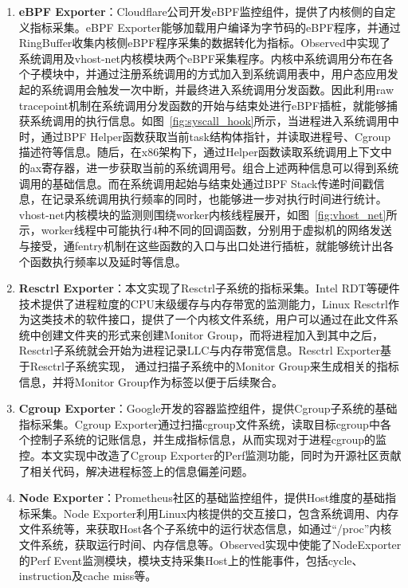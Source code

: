 \begin{enumerate}
    \item \textbf{eBPF Exporter}：Cloudflare公司开发eBPF监控组件，提供了内核侧的自定义指标采集。eBPF Exporter能够加载用户编译为字节码的eBPF程序，并通过RingBuffer收集内核侧eBPF程序采集的数据转化为指标。Observed中实现了系统调用及vhost-net内核模块两个eBPF采集程序。内核中系统调用分布在各个子模块中，并通过注册系统调用的方式加入到系统调用表中，用户态应用发起的系统调用会触发一次中断，并最终进入系统调用分发函数。因此利用raw tracepoint机制在系统调用分发函数的开始与结束处进行eBPF插桩，就能够捕获系统调用的执行信息。如图~\ref{fig:syscall_hook}所示，当进程进入系统调用中时，通过BPF Helper函数获取当前task结构体指针，并读取进程号、Cgroup描述符等信息。随后，在x86架构下，通过Helper函数读取系统调用上下文中的ax寄存器，进一步获取当前的系统调用号。组合上述两种信息可以得到系统调用的基础信息。而在系统调用起始与结束处通过BPF Stack传递时间戳信息，在记录系统调用执行频率的同时，也能够进一步对执行时间进行统计。vhost-net内核模块的监测则围绕worker内核线程展开，如图~\ref{fig:vhost_net}所示，worker线程中可能执行4种不同的回调函数，分别用于虚拟机的网络发送与接受，通fentry机制在这些函数的入口与出口处进行插桩，就能够统计出各个函数执行频率以及延时等信息。

    \item \textbf{Resctrl Exporter}：本文实现了Resctrl子系统的指标采集。Intel RDT等硬件技术提供了进程粒度的CPU末级缓存与内存带宽的监测能力，Linux Resctrl作为这类技术的软件接口，提供了一个内核文件系统，用户可以通过在此文件系统中创建文件夹的形式来创建Monitor Group，而将进程加入到其中之后，Resctrl子系统就会开始为进程记录LLC与内存带宽信息。Resctrl Exporter基于Resctrl子系统实现， 通过扫描子系统中的Monitor Group来生成相关的指标信息，并将Monitor Group作为标签以便于后续聚合。
    
    \item \textbf{Cgroup Exporter}：Google开发的容器监控组件，提供Cgroup子系统的基础指标采集。Cgroup Exporter通过扫描cgroup文件系统，读取目标cgroup中各个控制子系统的记账信息，并生成指标信息，从而实现对于进程cgroup的监控。本文实现中改造了Cgroup Exporter的Perf监测功能，同时为开源社区贡献了相关代码，解决进程标签上的信息偏差问题。
    
    \item \textbf{Node Exporter}：Prometheus社区的基础监控组件，提供Host维度的基础指标采集。Node Exporter利用Linux内核提供的交互接口，包含系统调用、内存文件系统等，来获取Host各个子系统中的运行状态信息，如通过“/proc”内核文件系统，获取运行时间、内存信息等。Observed实现中使能了NodeExporter的Perf Event监测模块，模块支持采集Host上的性能事件，包括cycle、instruction及cache miss等。

\end{enumerate}

